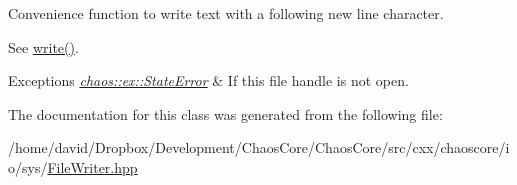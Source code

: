 Convenience function to write text with a following new line character. 

See \hyperlink{classchaos_1_1io_1_1sys_1_1_file_writer_adb940c8094f94604f78879b3901584d4}{write()}.


\begin{DoxyExceptions}{Exceptions}
{\em \hyperlink{classchaos_1_1ex_1_1_state_error}{chaos\-::ex\-::\-State\-Error}} & If this file handle is not open. \\
\hline
\end{DoxyExceptions}


The documentation for this class was generated from the following file\-:\begin{DoxyCompactItemize}
\item 
/home/david/\-Dropbox/\-Development/\-Chaos\-Core/\-Chaos\-Core/src/cxx/chaoscore/io/sys/\hyperlink{_file_writer_8hpp}{File\-Writer.\-hpp}\end{DoxyCompactItemize}
